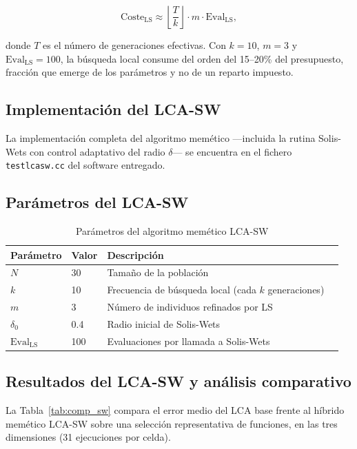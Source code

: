 \begin{equation}
  \text{Coste}_{\text{LS}} \approx \left\lfloor \frac{T}{k} \right\rfloor \cdot m \cdot \text{Eval}_{\text{LS}},
\end{equation}

donde $T$ es el número de generaciones efectivas. Con $k=10$, $m=3$ y
$\text{Eval}_{\text{LS}}=100$, la búsqueda local consume del orden del 15--20\% del
presupuesto, fracción que emerge de los parámetros y no de un reparto impuesto.

\subsection{Implementación del LCA-SW}

La implementaci\'on completa del algoritmo memético ---incluida la rutina Solis-Wets con control adaptativo del radio $\delta$--- se encuentra en el fichero \texttt{testlcasw.cc} del software entregado.

\subsection{Parámetros del LCA-SW}

\begin{table}[h!]
\centering
\caption{Parámetros del algoritmo memético LCA-SW}
\label{tab:params_sw}
\renewcommand{\arraystretch}{1.3}
\begin{tabular}{@{}llll@{}}
\toprule
\textbf{Parámetro} & \textbf{Valor} & \textbf{Descripción} \\
\midrule
$N$ & 30 & Tamaño de la población \\
$k$ & 10 & Frecuencia de búsqueda local (cada $k$ generaciones) \\
$m$ & 3  & Número de individuos refinados por LS \\
$\delta_0$ & 0.4 & Radio inicial de Solis-Wets \\
$\text{Eval}_{\text{LS}}$ & 100 & Evaluaciones por llamada a Solis-Wets \\
\bottomrule
\end{tabular}
\end{table}

\subsection{Resultados del LCA-SW y análisis comparativo}

La Tabla~\ref{tab:comp_sw} compara el error medio del LCA base frente al híbrido memético
LCA-SW sobre una selección representativa de funciones, en las tres dimensiones
(31 ejecuciones por celda).

